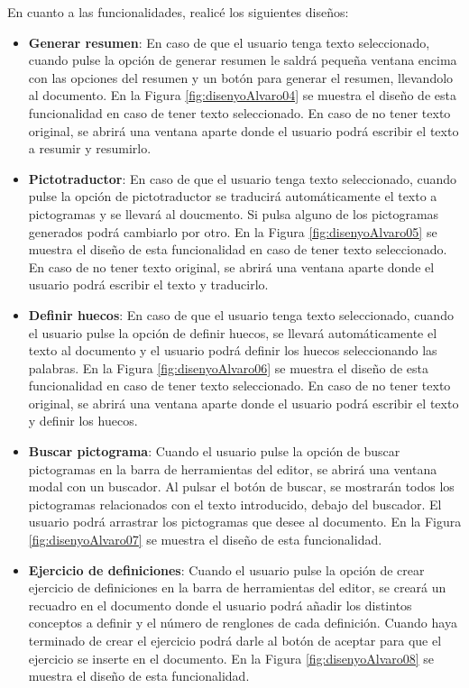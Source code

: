 En cuanto a las funcionalidades, realicé los siguientes diseños:
\begin{itemize}
  \item \textbf{Generar resumen}: En caso de que el usuario tenga texto seleccionado, cuando pulse la opción de generar resumen le saldrá pequeña ventana encima con las opciones del resumen y un botón para generar el resumen, llevandolo al documento. En la Figura \ref{fig:disenyoAlvaro04} se muestra el diseño de esta funcionalidad en caso de tener texto seleccionado. En caso de no tener texto original, se abrirá una ventana aparte donde el usuario podrá escribir el texto a resumir y resumirlo.
  \item \textbf{Pictotraductor}: En caso de que el usuario tenga texto seleccionado, cuando pulse la opción de pictotraductor se traducirá automáticamente el texto a pictogramas y se llevará al doucmento. Si pulsa alguno de los pictogramas generados podrá cambiarlo por otro. En la Figura \ref{fig:disenyoAlvaro05} se muestra el diseño de esta funcionalidad en caso de tener texto seleccionado. En caso de no tener texto original, se abrirá una ventana aparte donde el usuario podrá escribir el texto y traducirlo. 
  \item \textbf{Definir huecos}: En caso de que el usuario tenga texto seleccionado, cuando el usuario pulse la opción de definir huecos, se llevará automáticamente el texto al documento y el usuario podrá definir los huecos seleccionando las palabras. En la Figura \ref{fig:disenyoAlvaro06} se muestra el diseño de esta funcionalidad en caso de tener texto seleccionado. En caso de no tener texto original, se abrirá una ventana aparte donde el usuario podrá escribir el texto y definir los huecos.
  \item \textbf{Buscar pictograma}: Cuando el usuario pulse la opción de buscar pictogramas en la barra de herramientas del editor, se abrirá una ventana modal con un buscador. Al pulsar el botón de buscar, se mostrarán todos los pictogramas relacionados con el texto introducido, debajo del buscador.
  El usuario podrá arrastrar los pictogramas que desee al documento. En la Figura \ref{fig:disenyoAlvaro07} se muestra el diseño de esta funcionalidad.
  \item \textbf{Ejercicio de definiciones}: Cuando el usuario pulse la opción de crear ejercicio de definiciones en la barra de herramientas del editor, se creará un recuadro en el documento donde el usuario podrá añadir los distintos conceptos a definir y el número de renglones de cada definición. Cuando haya terminado de crear el ejercicio podrá darle al botón de aceptar para que el ejercicio se inserte en el documento. En la Figura \ref{fig:disenyoAlvaro08} se muestra el diseño de esta funcionalidad.

\end{itemize}
